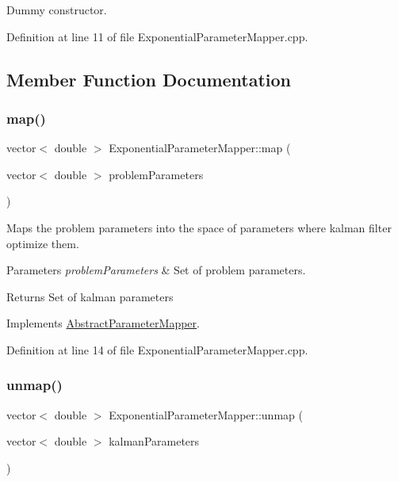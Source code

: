 Dummy constructor. 

Definition at line 11 of file Exponential\+Parameter\+Mapper.\+cpp.



\subsection{Member Function Documentation}
\mbox{\label{classExponentialParameterMapper_a6abcf5b0efb8ef01ced062b7498c923e}} 
\subsubsection{\texorpdfstring{map()}{map()}}
{\footnotesize\ttfamily vector$<$ double $>$ Exponential\+Parameter\+Mapper\+::map (\begin{DoxyParamCaption}\item[{vector$<$ double $>$}]{problem\+Parameters }\end{DoxyParamCaption})\hspace{0.3cm}{\ttfamily [virtual]}}

Maps the problem parameters into the space of parameters where kalman filter optimize them. 
\begin{DoxyParams}{Parameters}
{\em problem\+Parameters} & Set of problem parameters. \\
\hline
\end{DoxyParams}
\begin{DoxyReturn}{Returns}
Set of kalman parameters 
\end{DoxyReturn}


Implements \mbox{\hyperlink{classAbstractParameterMapper_abb9e78545ff023f2b786b759ec2d23e4}{Abstract\+Parameter\+Mapper}}.



Definition at line 14 of file Exponential\+Parameter\+Mapper.\+cpp.

\mbox{\label{classExponentialParameterMapper_ad7040a1ac834e53691bd157df925c545}} 
\subsubsection{\texorpdfstring{unmap()}{unmap()}}
{\footnotesize\ttfamily vector$<$ double $>$ Exponential\+Parameter\+Mapper\+::unmap (\begin{DoxyParamCaption}\item[{vector$<$ double $>$}]{kalman\+Parameters }\end{DoxyParamCaption})\hspace{0.3cm}{\ttfamily [virtual]}}

